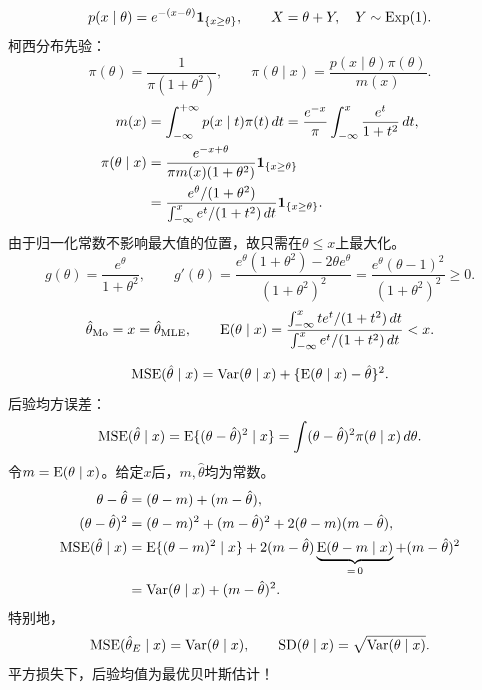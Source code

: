 \[
p(x\mid\theta)=e^{-(x-\theta)}\mathbf{1}_{\{x\geq\theta\}},
\qquad X=\theta+Y,\quad Y\sim\operatorname{Exp}(1).
\]
柯西分布先验：
\[
\pi(\theta)=\frac1{\pi(1+\theta^2)},\qquad
\pi(\theta\mid x)=\frac{p(x\mid\theta)\pi(\theta)}{m(x)}.
\]
\begin{align*}
m(x)&=\int_{-\infty}^{+\infty}p(x\mid t)\pi(t)\,dt
=\frac{e^{-x}}\pi\int_{-\infty}^x\frac{e^t}{1+t^2}\,dt,\\
\pi(\theta\mid x)
&=\frac{e^{-x+\theta}}{\pi m(x)(1+\theta^2)}
\mathbf{1}_{\{x\geq\theta\}}\\
&=\frac{e^\theta/(1+\theta^2)}
{\int_{-\infty}^xe^t/(1+t^2)\,dt}\mathbf{1}_{\{x\geq\theta\}}.
\end{align*}
由于归一化常数不影响最大值的位置，故只需在$\theta\leq x$上最大化。
\[
g(\theta)=\frac{e^\theta}{1+\theta^2},\qquad
g'(\theta)=\frac{e^\theta(1+\theta^2)-2\theta e^\theta}{(1+\theta^2)^2}
=\frac{e^\theta(\theta-1)^2}{(1+\theta^2)^2}\geq0.
\]
\[
\hat\theta_{\mathrm{Mo}}=x=\hat\theta_{\mathrm{MLE}},\qquad
\operatorname{E}(\theta\mid x)=
\frac{\int_{-\infty}^x te^t/(1+t^2)\,dt}
{\int_{-\infty}^x e^t/(1+t^2)\,dt}<x.
\]

\[
\operatorname{MSE}(\hat\theta\mid x)
=\operatorname{Var}(\theta\mid x)+\{\operatorname{E}(\theta\mid x)-\hat\theta\}^2.
\]
后验均方误差：
\[
\operatorname{MSE}(\hat\theta\mid x)
=\operatorname{E}\{(\theta-\hat\theta)^2\mid x\}
=\int(\theta-\hat\theta)^2\pi(\theta\mid x)\,d\theta.
\]
令$m=\operatorname{E}(\theta\mid x)$。给定$x$后，$m,\hat\theta$均为常数。
\begin{align*}
\theta-\hat\theta&=(\theta-m)+(m-\hat\theta),\\
(\theta-\hat\theta)^2
&=(\theta-m)^2+(m-\hat\theta)^2+2(\theta-m)(m-\hat\theta),\\
\operatorname{MSE}(\hat\theta\mid x)
&=\operatorname{E}\{(\theta-m)^2\mid x\}
+2(m-\hat\theta)\underbrace{\operatorname{E}(\theta-m\mid x)}_{=\,0}
+(m-\hat\theta)^2\\
&=\operatorname{Var}(\theta\mid x)+(m-\hat\theta)^2.
\end{align*}
特别地，
\[
\operatorname{MSE}(\hat\theta_E\mid x)=\operatorname{Var}(\theta\mid x),\qquad
\operatorname{SD}(\theta\mid x)=\sqrt{\operatorname{Var}(\theta\mid x)}.
\]
平方损失下，后验均值为最优贝叶斯估计！

